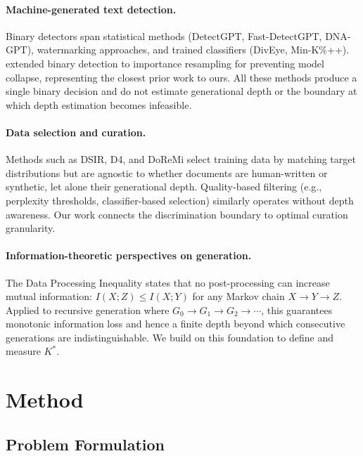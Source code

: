 \documentclass[11pt]{article}
\begin{document}
\paragraph{Machine-generated text detection.}
Binary detectors span statistical methods (DetectGPT, Fast-DetectGPT, DNA-GPT), watermarking approaches, and trained classifiers (DivEye, Min-K\%++). \citet{drayson2025synthetic} extended binary detection to importance resampling for preventing model collapse, representing the closest prior work to ours. All these methods produce a single binary decision and do not estimate generational depth or the boundary at which depth estimation becomes infeasible.

\paragraph{Data selection and curation.}
Methods such as DSIR, D4, and DoReMi select training data by matching target distributions but are agnostic to whether documents are human-written or synthetic, let alone their generational depth. Quality-based filtering (e.g., perplexity thresholds, classifier-based selection) similarly operates without depth awareness. Our work connects the discrimination boundary to optimal curation granularity.

\paragraph{Information-theoretic perspectives on generation.}
The Data Processing Inequality states that no post-processing can increase mutual information: $I(X; Z) \le I(X; Y)$ for any Markov chain $X \to Y \to Z$. Applied to recursive generation where $G_0 \to G_1 \to G_2 \to \cdots$, this guarantees monotonic information loss and hence a finite depth beyond which consecutive generations are indistinguishable. We build on this foundation to define and measure $K^*$.

\section{Method}

\subsection{Problem Formulation}
\end{document}
